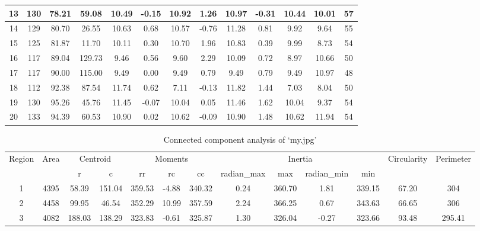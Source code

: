 \documentclass[a4paper]{article}
\begin{document}
\begin{table}[h]
\begin{tabular}{|c|c|c|c|c|c|c|c|c|c|c|c|c|}
		\hline
		13    & 130   & 78.21  & 59.08  & 10.49  & -0.15  & 10.92  & 1.26  & 10.97  & -0.31  & 10.44  & 10.01  & 57 \bigstrut\\
		\hline
		14    & 129   & 80.70  & 26.55  & 10.63  & 0.68  & 10.57  & -0.76  & 11.28  & 0.81  & 9.92  & 9.64  & 55 \bigstrut\\
		\hline
		15    & 125   & 81.87  & 11.70  & 10.11  & 0.30  & 10.70  & 1.96  & 10.83  & 0.39  & 9.99  & 8.73  & 54 \bigstrut\\
		\hline
		16    & 117   & 89.04  & 129.73  & 9.46  & 0.56  & 9.60  & 2.29  & 10.09  & 0.72  & 8.97  & 10.66  & 50 \bigstrut\\
		\hline
		17    & 117   & 90.00  & 115.00  & 9.49  & 0.00  & 9.49  & 0.79  & 9.49  & 0.79  & 9.49  & 10.97  & 48 \bigstrut\\
		\hline
		18    & 112   & 92.38  & 87.54  & 11.74  & 0.62  & 7.11  & -0.13  & 11.82  & 1.44  & 7.03  & 8.04  & 50 \bigstrut\\
		\hline
		19    & 130   & 95.26  & 45.76  & 11.45  & -0.07  & 10.04  & 0.05  & 11.46  & 1.62  & 10.04  & 9.37  & 54 \bigstrut\\
		\hline
		20    & 133   & 94.39  & 60.53  & 10.90  & 0.02  & 10.62  & -0.09  & 10.90  & 1.48  & 10.62  & 11.94  & 54 \bigstrut\\
		\hline
	\end{tabular}%
	\label{table:Hw2-3A analysis}%
\end{table}%

\begin{table}[h]
	\centering
	\caption{Connected component analysis of `my.jpg'}
	\begin{tabular}{|c|c|c|c|c|c|c|c|c|c|c|c|c|}
		\hline
		\multirow{2}[4]{*}{Region} & \multirow{2}[4]{*}{Area} & \multicolumn{2}{c|}{Centroid} & \multicolumn{3}{c|}{Moments} & \multicolumn{4}{c|}{Inertia}  & \multirow{2}[4]{*}{Circularity} & \multirow{2}[4]{*}{Perimeter} \bigstrut\\
		\cline{3-11}          &       & r     & c     & rr    & rc    & cc    & radian\_max & max   & radian\_min & min   &       &  \bigstrut\\
		\hline
		1     & 4395  & 58.39  & 151.04  & 359.53  & -4.88  & 340.32  & 0.24  & 360.70  & 1.81  & 339.15  & 67.20  & 304 \bigstrut\\
		\hline
		2     & 4458  & 99.95  & 46.54  & 352.29  & 10.99  & 357.59  & 2.24  & 366.25  & 0.67  & 343.63  & 66.65  & 306 \bigstrut\\
		\hline
		3     & 4082  & 188.03  & 138.29  & 323.83  & -0.61  & 325.87  & 1.30  & 326.04  & -0.27  & 323.66  & 93.48  & 295.41  \bigstrut\\
		\hline
	\end{tabular}%
	\label{table:my analysis}%
\end{table}%
\end{document}
